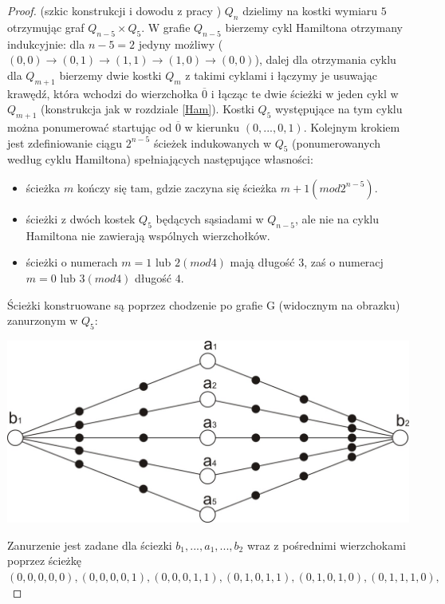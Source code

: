 \documentclass{pracamgr}
\begin{document}
     \begin{proof}(szkic konstrukcji i dowodu z pracy \cite{Snake2})
      $Q_n$ dzielimy na kostki wymiaru $5$ otrzymując graf $Q_{n-5}\times Q_5$. W grafie $Q_{n-5}$ bierzemy cykl Hamiltona otrzymany indukcyjnie:
      dla $n-5=2$ jedyny możliwy ($(0,0)\rightarrow(0,1)\rightarrow(1,1)\rightarrow(1,0)\rightarrow(0,0)$),
      dalej dla otrzymania cyklu dla $Q_{m+1}$ bierzemy dwie kostki $Q_m$ z takimi cyklami i łączymy je usuwając krawędź, która wchodzi do wierzchołka
      $\overline{0}$ i łącząc te dwie ścieżki w jeden cykl w $Q_{m+1}$ (konstrukcja jak w rozdziale \ref{Ham}).
      Kostki $Q_5$ występujące na tym cyklu można ponumerować startując od $\overline{0}$ w kierunku $(0,...,0,1)$.\newline
      Kolejnym krokiem jest zdefiniowanie ciągu $2^{n-5}$ ścieżek indukowanych w $Q_5$ (ponumerowanych według cyklu Hamiltona)
      spełniających następujące własności:
      \begin{itemize}
       \item ścieżka $m$ kończy się tam, gdzie zaczyna się ścieżka $m+1 (mod 2^{n-5})$.
       \item ścieżki z dwóch kostek $Q_5$ będących sąsiadami w $Q_{n-5}$, ale nie na cyklu Hamiltona nie zawierają wspólnych wierzchołków.
       \item ścieżki o numerach $m=1$ lub $2(mod 4)$ mają długość $3$, zaś o numeracj $m=0$ lub $3(mod 4)$ długość $4$.
      \end{itemize}
      Ścieżki konstruowane są poprzez chodzenie po grafie G (widocznym na obrazku) zanurzonym w $Q_5$:
      \begin{center}
       \includegraphics[scale=1]{img/snake_G.jpg}
      \end{center}
      Zanurzenie jest zadane dla ściezki $b_1,...,a_1,...,b_2$ wraz z pośrednimi wierzchokami poprzez ścieżkę
      $(0,0,0,0,0),(0,0,0,0,1),(0,0,0,1,1),(0,1,0,1,1),(0,1,0,1,0),(0,1,1,1,0),$\newline

\end{proof}
\end{document}
